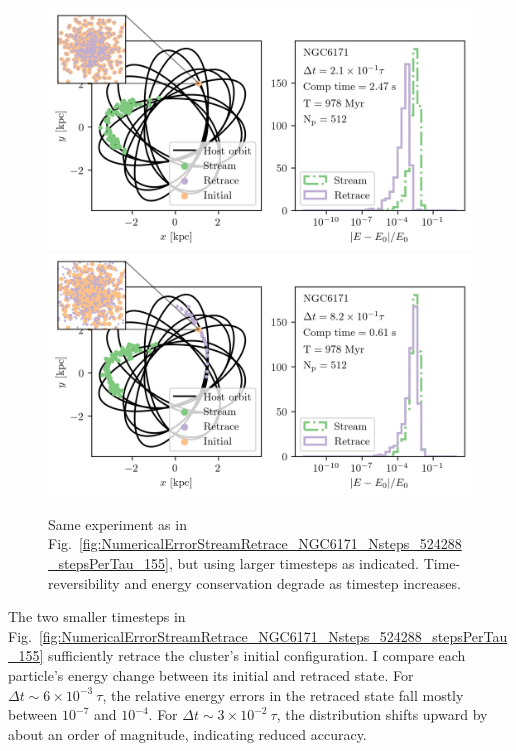         \begin{figure}
            \centering
            \includegraphics[width=\linewidth]{images/NumericalErrorStreamRetrace_NGC6171_Nsteps_16384_stepsPerTau_4.png}
            \includegraphics[width=\linewidth]{images/NumericalErrorStreamRetrace_NGC6171_Nsteps_4096_stepsPerTau_1.png}
            \caption{Same experiment as in Fig.~\ref{fig:NumericalErrorStreamRetrace_NGC6171_Nsteps_524288_stepsPerTau_155}, but using larger timesteps as indicated. Time-reversibility and energy conservation degrade as timestep increases.}
            \label{fig:NumericalErrorStreamRetrace_NGC6171_Nsteps_4096_stepsPerTau_1}
        \end{figure}

        The two smaller timesteps in Fig.~\ref{fig:NumericalErrorStreamRetrace_NGC6171_Nsteps_524288_stepsPerTau_155} sufficiently retrace the cluster's initial configuration. I compare each particle's energy change between its initial and retraced state. For $\Delta t \sim 6\times10^{-3}~\tau$, the relative energy errors in the retraced state fall mostly between $10^{-7}$ and $10^{-4}$. For $\Delta t \sim 3\times10^{-2}~\tau$, the distribution shifts upward by about an order of magnitude, indicating reduced accuracy.

